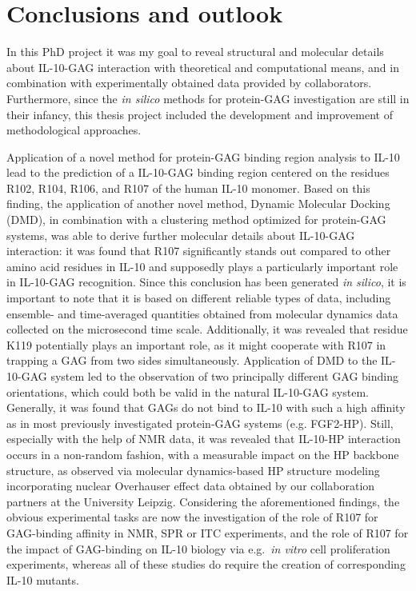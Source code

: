 \chapter{Conclusions and outlook}

In this PhD project it was my goal to reveal structural and molecular details
about IL-10-GAG interaction with theoretical and computational means, and in
combination with experimentally obtained data provided by collaborators.
Furthermore, since the \textit{in silico} methods for protein-GAG investigation
are still in their infancy, this thesis project included the development and
improvement of methodological approaches.

Application of a novel method for protein-GAG binding region analysis to IL-10
lead to the prediction of a IL-10-GAG binding region centered on the residues
R102, R104, R106, and R107 of the human IL-10 monomer. Based on this finding,
the application of another novel method, Dynamic Molecular Docking (DMD), in
combination with a clustering method optimized for protein-GAG systems, was able
to derive further molecular details about IL-10-GAG interaction: it was found
that R107 significantly stands out compared to other amino acid residues in
IL-10 and supposedly plays a particularly important role in IL-10-GAG
recognition. Since this conclusion has been generated \textit{in silico}, it is
important to note that it is based on different reliable types of data,
including ensemble- and time-averaged quantities obtained from molecular
dynamics data collected on the microsecond time scale. Additionally, it was
revealed that residue K119 potentially plays an important role, as it might
cooperate with R107 in trapping a GAG from two sides simultaneously. Application
of DMD to the IL-10-GAG system led to the observation of two principally
different GAG binding orientations, which could both be valid in the natural
IL-10-GAG system. Generally, it was found that GAGs do not bind to IL-10 with
such a high affinity as in most previously investigated protein-GAG systems
(e.g. FGF2-HP). Still, especially with the help of NMR data, it was revealed
that IL-10-HP interaction occurs in a non-random fashion, with a measurable
impact on the HP backbone structure, as observed via molecular dynamics-based HP
structure modeling incorporating nuclear Overhauser effect data obtained by our
collaboration partners at the University Leipzig. Considering the aforementioned
findings, the obvious experimental tasks are now the investigation of the role
of R107 for GAG-binding affinity in NMR, SPR or ITC experiments, and the role of
R107 for the impact of GAG-binding on IL-10 biology via e.g.\ \textit{in vitro}
cell proliferation experiments, whereas all of these studies do require the
creation of corresponding IL-10 mutants.

